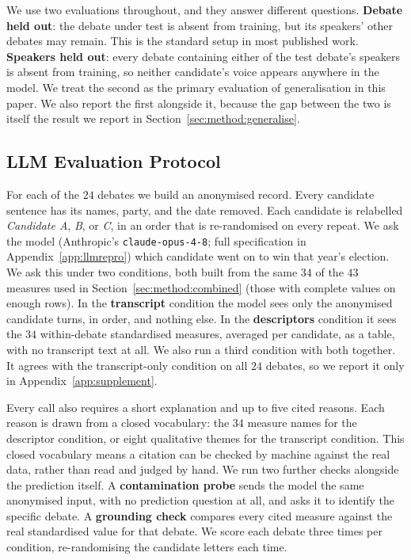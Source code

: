 \documentclass[pdflatex,sn-mathphys-num]{sn-jnl}%
\begin{document}
We use two evaluations throughout, and they answer different questions.
\textbf{Debate held out}: the debate under test is absent from training, but
its speakers' other debates may remain. This is the standard setup in most
published work. \textbf{Speakers held out}: every debate containing either
of the test debate's speakers is absent from training, so neither
candidate's voice appears anywhere in the model. We treat the second as the
primary evaluation of generalisation in this paper. We also report the first
alongside it, because the gap between the two is itself the result we report
in Section~\ref{sec:method:generalise}.

\subsection{LLM Evaluation Protocol}
\label{sec:method:llmprotocol}

For each of the $24$ debates we build an anonymised record. Every candidate
sentence has its names, party, and the date removed. Each candidate is
relabelled \emph{Candidate A}, \emph{B}, or \emph{C}, in an order that is
re-randomised on every repeat. We ask the model (Anthropic's
\texttt{claude-opus-4-8}; full specification in Appendix~\ref{app:llmrepro})
which candidate went on to win that year's election. We ask this under two
conditions, both built from the same $34$ of the $43$ measures used in
Section~\ref{sec:method:combined} (those with complete values on enough
rows). In the \textbf{transcript} condition the model sees only the
anonymised candidate turns, in order, and nothing else. In the
\textbf{descriptors} condition it sees the $34$ within-debate standardised
measures, averaged per candidate, as a table, with no transcript text at
all. We also run a third condition with both together. It agrees with the
transcript-only condition on all $24$ debates, so we report it only in
Appendix~\ref{app:supplement}.

Every call also requires a short explanation and up to five cited reasons.
Each reason is drawn from a closed vocabulary: the $34$ measure names for
the descriptor condition, or eight qualitative themes for the transcript
condition. This closed vocabulary means a citation can be checked by machine
against the real data, rather than read and judged by hand. We run two further checks
alongside the prediction itself. A \textbf{contamination probe} sends the
model the same anonymised input, with no prediction question at all, and
asks it to identify the specific debate. A \textbf{grounding check} compares
every cited measure against the real standardised value for that debate. We
score each debate three times per condition, re-randomising the candidate
letters each time.
\end{document}
